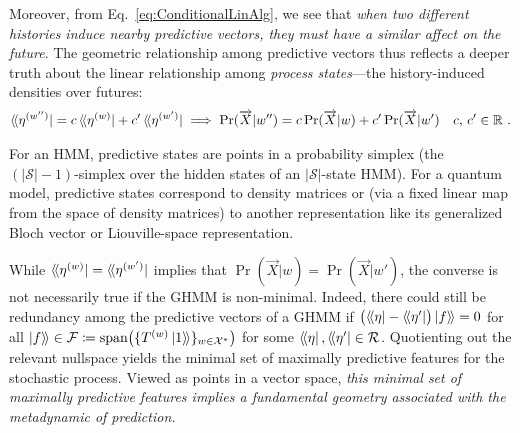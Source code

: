 \documentclass[prx,nofootinbib,onecolumn,showkeys,groupaddress,preprintnumbers,floatfix,
superscriptaddress]{revtex4-1}
\newcommand{\dbra}[1]{\bra{ \! \langle #1}}
\newcommand{\dket}[1]{\ket{ #1 \rangle \!}}
\begin{document}
 



Moreover, from Eq.~\eqref{eq:ConditionalLinAlg}, 
we see that \emph{when two different histories induce nearby predictive vectors, they must have a similar affect on the future}.  The geometric relationship among predictive vectors thus reflects a deeper truth about the %
linear relationship among 
\emph{process states}---the history-induced densities over futures:
\begin{align}
\dbra{\eta^{(w'')}} = c  \dbra{\eta^{(w)}} + c' \dbra{\eta^{(w')}} 
\implies
\Pr(\overrightarrow{X} | w'') = c \Pr(\overrightarrow{X} | w)  + c' \Pr(\overrightarrow{X} | w') \quad c, \, c' \in \mathbb{R} ~.
\end{align}

For an HMM, predictive states 
are points in a probability simplex (the $(|\mathcal{S}| \!-\!1)$-simplex over the hidden states of an $|\mathcal{S}|$-state HMM).
For a quantum model, 
predictive states correspond to density matrices or (via a fixed linear map from the space of density matrices) to another representation like its generalized Bloch vector or Liouville-space representation.

While $\dbra{\eta^{(w)}} = \dbra{\eta^{(w')}}$ implies that 
$\Pr(\overrightarrow{X} | w) = \Pr(\overrightarrow{X} | w') $, 
the converse is not necessarily true if the GHMM is non-minimal.
Indeed,
there could still be redundancy among the predictive vectors 
of a GHMM
if 
 $\bigl( \dbra{\eta} - \dbra{\eta'} \bigr) \dket{f} = 0 $ for all $\dket{f} \in \mathcal{F} \coloneqq 
 \text{span} \bigl( \{ T^{(w)} \dket{1} \}_{w \in \mathcal{X}^*} \bigr)$
 for some $\dbra{\eta} ,  \dbra{\eta'} \in \mathcal{R}$.
 Quotienting out the relevant nullspace 
 yields the minimal set of maximally predictive features for the stochastic process.
 Viewed as points in a vector space, \emph{this minimal set of  maximally predictive features implies a fundamental geometry associated with the metadynamic of prediction.}
\end{document}
